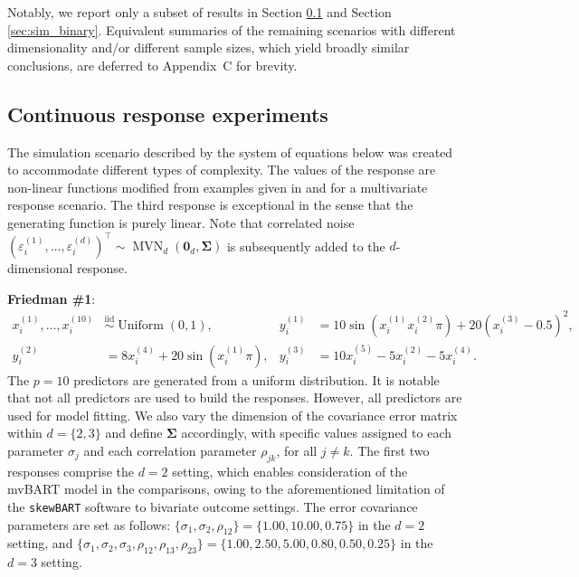 \documentclass[aoas,preprint]{imsart}
\theoremstyle{plain}
\theoremstyle{definition}
\theoremstyle{remark}
\begin{document}
Notably, we report only a subset of results in Section \ref{sec:sim_continuous} and Section \ref{sec:sim_binary}. Equivalent summaries of the remaining scenarios with different dimensionality and/or different sample sizes, which yield broadly similar conclusions, are deferred to Appendix~C for brevity.

\subsection{Continuous response experiments}\label{sec:sim_continuous}

The simulation scenario described by the system of equations below was created to accommodate different types of complexity. The values of the response are non-linear functions modified from examples given in \citet{friedman1991multivariate} and \citet{breiman1996bagging} for a multivariate response scenario. The third response is exceptional in the sense that the generating function is purely linear. Note that correlated noise $(\varepsilon_i^{(1)}, \ldots, \varepsilon_i^{(d)})^\top \sim \operatorname{MVN}_{d}(\mathbf{0}_d, \boldsymbol{\Sigma})$ is subsequently added to the $d$-dimensional response.\smallskip

\noindent\textbf{Friedman \#1}:
\begin{align*}
x^{(1)}_{i}, \ldots, x_{i}^{(10)} &\overset{\mathrm{iid}}{\sim} \operatorname{Uniform}(0, 1), &
y_{i}^{(1)} &= 10 \sin(x_{i}^{(1)} x_{i}^{(2)} \pi) + 20(x_{i}^{(3)} - 0.5)^2, \\
y_{i}^{(2)} &= 8 x_{i}^{(4)} + 20 \sin(x_{i}^{(1)} \pi),&
y_{i}^{(3)} &= 10 x_{i}^{(5)} - 5 x_{i}^{(2)} - 5 x_{i}^{(4)}.
\end{align*}
\indent The $p=10$ predictors are generated from a uniform distribution. 
It is notable that not all predictors are used to build the responses. However, all predictors are used for model fitting. We also vary the dimension of the covariance error matrix within $d = \{2,3\}$ and define $\boldsymbol{\Sigma}$ accordingly, with specific values assigned to each parameter $\sigma_{j}$ and each correlation parameter $\rho_{jk}$, for all $j\neq k$. The first two responses comprise the $d=2$ setting, which enables consideration of the mvBART model in the comparisons, owing to the aforementioned limitation of the \texttt{skewBART} software to bivariate outcome settings. The error covariance parameters are set as follows: $\{ \sigma_{1}, \sigma_{2}, \rho_{12}\}  = \{1.00,10.00,0.75\}$ in the $d=2$ setting, and $\{ \sigma_{1}, \sigma_{2},\sigma_{3},\rho_{12},\rho_{13},\rho_{23}\}  = \{1.00,2.50,5.00,0.80,0.50,0.25\}$ in the $d=3$ setting.
\end{document}
